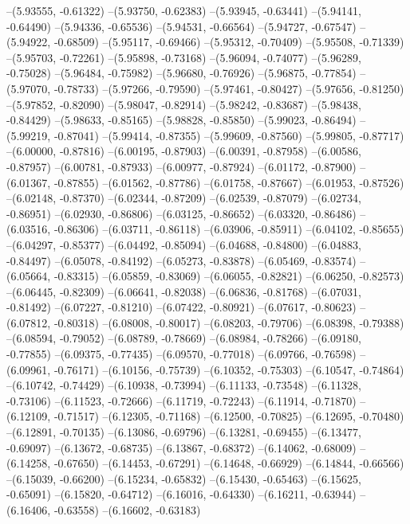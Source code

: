 --(5.93555, -0.61322)
--(5.93750, -0.62383)
--(5.93945, -0.63441)
--(5.94141, -0.64490)
--(5.94336, -0.65536)
--(5.94531, -0.66564)
--(5.94727, -0.67547)
--(5.94922, -0.68509)
--(5.95117, -0.69466)
--(5.95312, -0.70409)
--(5.95508, -0.71339)
--(5.95703, -0.72261)
--(5.95898, -0.73168)
--(5.96094, -0.74077)
--(5.96289, -0.75028)
--(5.96484, -0.75982)
--(5.96680, -0.76926)
--(5.96875, -0.77854)
--(5.97070, -0.78733)
--(5.97266, -0.79590)
--(5.97461, -0.80427)
--(5.97656, -0.81250)
--(5.97852, -0.82090)
--(5.98047, -0.82914)
--(5.98242, -0.83687)
--(5.98438, -0.84429)
--(5.98633, -0.85165)
--(5.98828, -0.85850)
--(5.99023, -0.86494)
--(5.99219, -0.87041)
--(5.99414, -0.87355)
--(5.99609, -0.87560)
--(5.99805, -0.87717)
--(6.00000, -0.87816)
--(6.00195, -0.87903)
--(6.00391, -0.87958)
--(6.00586, -0.87957)
--(6.00781, -0.87933)
--(6.00977, -0.87924)
--(6.01172, -0.87900)
--(6.01367, -0.87855)
--(6.01562, -0.87786)
--(6.01758, -0.87667)
--(6.01953, -0.87526)
--(6.02148, -0.87370)
--(6.02344, -0.87209)
--(6.02539, -0.87079)
--(6.02734, -0.86951)
--(6.02930, -0.86806)
--(6.03125, -0.86652)
--(6.03320, -0.86486)
--(6.03516, -0.86306)
--(6.03711, -0.86118)
--(6.03906, -0.85911)
--(6.04102, -0.85655)
--(6.04297, -0.85377)
--(6.04492, -0.85094)
--(6.04688, -0.84800)
--(6.04883, -0.84497)
--(6.05078, -0.84192)
--(6.05273, -0.83878)
--(6.05469, -0.83574)
--(6.05664, -0.83315)
--(6.05859, -0.83069)
--(6.06055, -0.82821)
--(6.06250, -0.82573)
--(6.06445, -0.82309)
--(6.06641, -0.82038)
--(6.06836, -0.81768)
--(6.07031, -0.81492)
--(6.07227, -0.81210)
--(6.07422, -0.80921)
--(6.07617, -0.80623)
--(6.07812, -0.80318)
--(6.08008, -0.80017)
--(6.08203, -0.79706)
--(6.08398, -0.79388)
--(6.08594, -0.79052)
--(6.08789, -0.78669)
--(6.08984, -0.78266)
--(6.09180, -0.77855)
--(6.09375, -0.77435)
--(6.09570, -0.77018)
--(6.09766, -0.76598)
--(6.09961, -0.76171)
--(6.10156, -0.75739)
--(6.10352, -0.75303)
--(6.10547, -0.74864)
--(6.10742, -0.74429)
--(6.10938, -0.73994)
--(6.11133, -0.73548)
--(6.11328, -0.73106)
--(6.11523, -0.72666)
--(6.11719, -0.72243)
--(6.11914, -0.71870)
--(6.12109, -0.71517)
--(6.12305, -0.71168)
--(6.12500, -0.70825)
--(6.12695, -0.70480)
--(6.12891, -0.70135)
--(6.13086, -0.69796)
--(6.13281, -0.69455)
--(6.13477, -0.69097)
--(6.13672, -0.68735)
--(6.13867, -0.68372)
--(6.14062, -0.68009)
--(6.14258, -0.67650)
--(6.14453, -0.67291)
--(6.14648, -0.66929)
--(6.14844, -0.66566)
--(6.15039, -0.66200)
--(6.15234, -0.65832)
--(6.15430, -0.65463)
--(6.15625, -0.65091)
--(6.15820, -0.64712)
--(6.16016, -0.64330)
--(6.16211, -0.63944)
--(6.16406, -0.63558)
--(6.16602, -0.63183)
